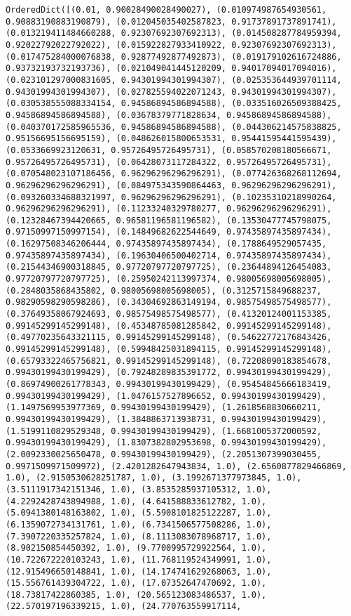\documentclass[11pt]{article}
\begin{document}
\begin{Verbatim}[commandchars=\\\{\}]
OrderedDict([(0.01, 0.90028490028490027), (0.010974987654930561, 0.90883190883190879), (0.012045035402587823, 0.91737891737891741), (0.013219411484660288, 0.92307692307692313), (0.014508287784959394, 0.92022792022792022), (0.015922827933410922, 0.92307692307692313), (0.017475284000076838, 0.92877492877492873), (0.019179102616724886, 0.93732193732193736), (0.021049041445120209, 0.94017094017094016), (0.023101297000831605, 0.94301994301994307), (0.025353644939701114, 0.94301994301994307), (0.027825594022071243, 0.94301994301994307), (0.030538555088334154, 0.94586894586894588), (0.033516026509388425, 0.94586894586894588), (0.03678379771828634, 0.94586894586894588), (0.040370172585965536, 0.94586894586894588), (0.044306214575838825, 0.95156695156695159), (0.048626015800653531, 0.95441595441595439), (0.0533669923120631, 0.95726495726495731), (0.058570208180566671, 0.95726495726495731), (0.06428073117284322, 0.95726495726495731), (0.070548023107186456, 0.96296296296296291), (0.077426368268112694, 0.96296296296296291), (0.084975343590864463, 0.96296296296296291), (0.093260334688321997, 0.96296296296296291), (0.10235310218990264, 0.96296296296296291), (0.11233240329780277, 0.96296296296296291), (0.12328467394420665, 0.96581196581196582), (0.13530477745798075, 0.97150997150997154), (0.14849682622544649, 0.97435897435897434), (0.16297508346206444, 0.97435897435897434), (0.1788649529057435, 0.97435897435897434), (0.19630406500402714, 0.97435897435897434), (0.21544346900318845, 0.97720797720797725), (0.23644894126454083, 0.97720797720797725), (0.25950242113997374, 0.98005698005698005), (0.2848035868435802, 0.98005698005698005), (0.3125715849688237, 0.98290598290598286), (0.34304692863149194, 0.98575498575498577), (0.37649358067924693, 0.98575498575498577), (0.41320124001153385, 0.99145299145299148), (0.45348785081285842, 0.99145299145299148), (0.49770235643321115, 0.99145299145299148), (0.54622772176843426, 0.99145299145299148), (0.59948425031894115, 0.99145299145299148), (0.65793322465756821, 0.99145299145299148), (0.72208090183854678, 0.99430199430199429), (0.79248289835391772, 0.99430199430199429), (0.86974900261778343, 0.99430199430199429), (0.95454845666183419, 0.99430199430199429), (1.0476157527896652, 0.99430199430199429), (1.1497569953977369, 0.99430199430199429), (1.2618568830660211, 0.99430199430199429), (1.3848863713938731, 0.99430199430199429), (1.5199110829529348, 0.99430199430199429), (1.6681005372000592, 0.99430199430199429), (1.8307382802953698, 0.99430199430199429), (2.0092330025650478, 0.99430199430199429), (2.2051307399030455, 0.9971509971509972), (2.4201282647943834, 1.0), (2.6560877829466869, 1.0), (2.9150530628251787, 1.0), (3.1992671377973845, 1.0), (3.5111917342151346, 1.0), (3.8535285937105312, 1.0), (4.2292428743894988, 1.0), (4.641588833612782, 1.0), (5.0941380148163802, 1.0), (5.5908101825122287, 1.0), (6.1359072734131761, 1.0), (6.7341506577508286, 1.0), (7.3907220335257824, 1.0), (8.1113083078968717, 1.0), (8.902150854450392, 1.0), (9.7700995729922564, 1.0), (10.722672220103243, 1.0), (11.768119524349991, 1.0), (12.915496650148841, 1.0), (14.174741629268063, 1.0), (15.556761439304722, 1.0), (17.07352647470692, 1.0), (18.73817422860385, 1.0), (20.565123083486537, 1.0), (22.570197196339215, 1.0), (24.770763559917114, 
\end{Verbatim}
\end{document}
